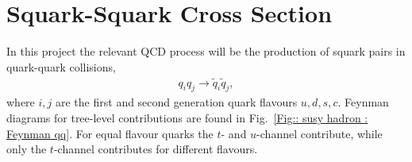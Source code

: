 \documentclass[twoside,english]{uiofysmaster}
\begin{document}
{%
%
%


\section{Squark-Squark Cross Section}
In this project the relevant QCD process will be the production of squark pairs in quark-quark collisions,
\begin{align}
q_i q_j \rightarrow \widetilde{q}_i \widetilde{q}_j,
\end{align}
where $i,j$ are the first and second generation quark flavours $u, d, s, c$. Feynman diagrams for tree-level contributions are found in Fig.\ \ref{Fig:: susy hadron : Feynman qq}. For equal flavour quarks the $t$- and $u$-channel contribute, while only the $t$-channel contributes for different flavours. 

}
\end{document}
